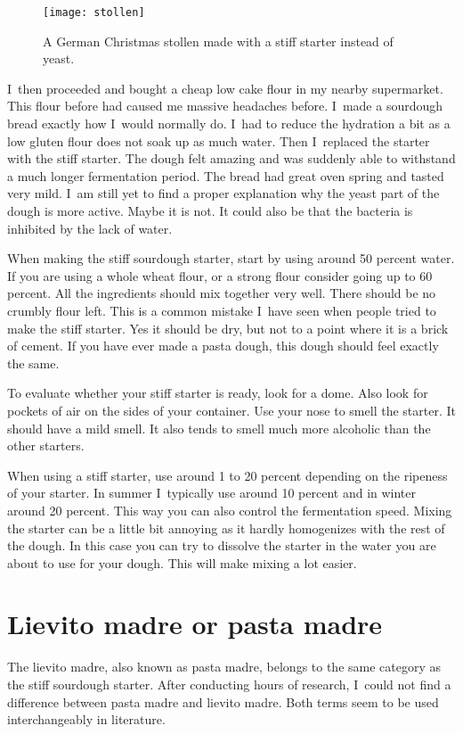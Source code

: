 \begin{figure}[!htb]
  \texttt{[image: stollen]}
  \caption{A German Christmas stollen made with a stiff starter instead of
  yeast.}%
  \label{fig:stollen}
\end{figure}

I~then proceeded and bought a cheap low cake flour in my nearby supermarket.
This flour before had caused me massive headaches before. I~made a sourdough bread
exactly how I~would normally do. I~had to reduce the hydration a bit as a low
gluten flour does not soak up as much water. Then I~replaced the starter with
the stiff starter. The dough felt amazing and was suddenly able to withstand a
much longer fermentation period. The bread had great oven spring and tasted
very mild. I~am still yet to find a proper explanation why the yeast part of
the dough is more active. Maybe it is not. It could also be that the bacteria
is inhibited by the lack of water.

When making the stiff sourdough starter, start by using around 50 percent
water. If you are using a whole wheat flour, or a strong flour consider going
up to 60 percent. All the ingredients should mix together very well. There
should be no crumbly flour left. This is a common mistake I~have seen when
people tried to make the stiff starter. Yes it should be dry, but not to a
point where it is a brick of cement. If you have ever made a pasta dough, this
dough should feel exactly the same.

To evaluate whether your stiff starter is ready, look for a dome. Also look for
pockets of air on the sides of your container. Use your nose to smell the
starter. It should have a mild smell. It also tends to smell much more
alcoholic than the other starters.

When using a stiff starter, use around 1 to 20 percent depending on the ripeness of
your starter. In summer I~typically use around 10 percent and in winter
around 20 percent. This way you can also control the fermentation speed.
Mixing the starter can be a little bit annoying as it hardly homogenizes with
the rest of the dough. In this case you can try to dissolve the starter in the
water you are about to use for your dough. This will make mixing a lot easier.


\section{Lievito madre or pasta madre}

The lievito madre, also known as pasta madre, belongs to the same category as
the stiff sourdough starter. After conducting hours of research, I~could not
find a difference between pasta madre and lievito madre. Both terms seem to be
used interchangeably in literature.

